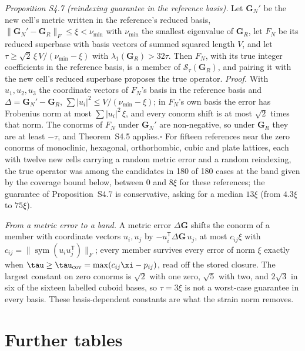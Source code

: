 \documentclass[preprint,pdf]{iucr}          %
\newcommand{\Gmet}{\mathbf{G}}
\newcommand{\Sw}{\mathcal{S}_\tau}
\newcommand{\sym}{\operatorname{sym}}
\begin{document}
\emph{Proposition S4.7 (reindexing guarantee in the reference basis).} Let $\Gmet_N'$ be the new cell's metric written in the reference's reduced basis, $\|\Gmet_N'-\Gmet_R\|_F\le\xi<\nu_{\min}$ with $\nu_{\min}$ the smallest eigenvalue of $\Gmet_R$, let $F_N$ be its reduced superbase with basis vectors of summed squared length $V$, and let $\tau\ge\sqrt2\,\xi\,V/(\nu_{\min}-\xi)$ with $\lambda_1(\Gmet_R)>32\tau$. Then $F_N$, with its true integer coefficients in the reference basis, is a member of $\Sw(\Gmet_R)$, and pairing it with the new cell's reduced superbase proposes the true operator. \emph{Proof.} With $u_1,u_2,u_3$ the coordinate vectors of $F_N$'s basis in the reference basis and $\Delta=\Gmet_N'-\Gmet_R$, $\sum|u_i|^2\le V/(\nu_{\min}-\xi)$; in $F_N$'s own basis the error has Frobenius norm at most $\sum|u_i|^2\,\xi$, and every conorm shift is at most $\sqrt2$ times that norm. The conorms of $F_N$ under $\Gmet_N'$ are non-negative, so under $\Gmet_R$ they are at least $-\tau$, and Theorem~S4.5 applies.\hfill$\square$ For fifteen references near the zero conorms of monoclinic, hexagonal, orthorhombic, cubic and plate lattices, each with twelve new cells carrying a random metric error and a random reindexing, the true operator was among the candidates in 180 of 180 cases at the band given by the coverage bound below, between $0$ and $8\xi$ for these references; the guarantee of Proposition~S4.7 is conservative, asking for a median $13\xi$ (from $4.3\xi$ to $75\xi$).

\emph{From a metric error to a band.} A metric error $\Delta\Gmet$ shifts the conorm of a member with coordinate vectors $u_i,u_j$ by $-u_i^{\mathsf T}\Delta\Gmet\,u_j$, at most $c_{ij}\xi$ with $c_{ij}=\|\sym(u_iu_j^{\mathsf T})\|_F$; every member survives every error of norm $\xi$ exactly when $\tau\ge\tau_{\rm cov}=\max(c_{ij}\xi-p_{ij})$, read off the stored closure. The largest constant on zero conorms is $\sqrt2$ with one zero, $\sqrt5$ with two, and $2\sqrt3$ in six of the sixteen labelled cuboid bases, so $\tau=3\xi$ is not a worst-case guarantee in every basis. These basis-dependent constants are what the strain norm removes.

\section{Further tables}
\end{document}
